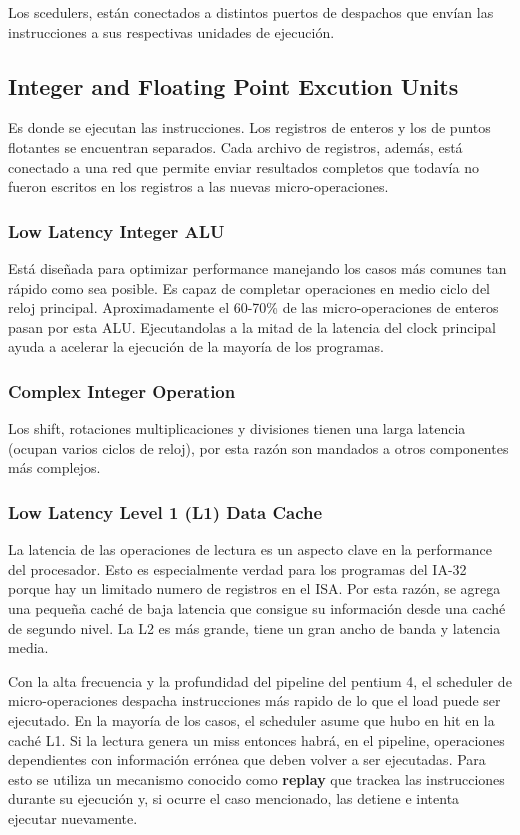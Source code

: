 Los scedulers, están conectados a distintos puertos de despachos que envían las instrucciones a sus respectivas unidades de ejecución.

\subsection{Integer and Floating Point Excution Units}
Es donde se ejecutan las instrucciones.
Los registros de enteros y los de puntos flotantes se encuentran separados. Cada archivo de registros, además, está conectado a una red que permite enviar resultados completos que todavía no fueron escritos en los registros a las nuevas micro-operaciones.

\subsubsection*{Low Latency Integer ALU}
Está diseñada para optimizar performance manejando los casos más comunes tan rápido como sea posible. Es capaz de completar operaciones en medio ciclo del reloj principal. Aproximadamente el 60-70\% de las micro-operaciones de enteros pasan por esta ALU. Ejecutandolas a la mitad de la latencia del clock principal ayuda a acelerar la ejecución de la mayoría de los programas.

\subsubsection*{Complex Integer Operation}
Los shift, rotaciones multiplicaciones y divisiones tienen una larga latencia (ocupan varios ciclos de reloj), por esta razón son mandados a otros componentes más complejos. 

\subsubsection*{Low Latency Level 1 (L1) Data Cache}
La latencia de las operaciones de lectura es un aspecto clave en la performance del procesador. Esto es especialmente verdad para los programas del IA-32 porque hay un limitado numero de registros en el ISA. Por esta razón, se agrega una pequeña caché de baja latencia que consigue su información desde una caché de segundo nivel. La L2 es más grande, tiene un gran ancho de banda y latencia media.

Con la alta frecuencia y la profundidad del pipeline del pentium 4, el scheduler de micro-operaciones despacha instrucciones más rapido de lo que el load puede ser ejecutado. En la mayoría de los casos, el scheduler asume que hubo en hit en la caché L1. Si la lectura genera un miss entonces habrá, en el pipeline, operaciones dependientes con información errónea que deben volver a ser ejecutadas. Para esto se utiliza un mecanismo conocido como \textbf{replay} que trackea las instrucciones durante su ejecución y, si ocurre el caso mencionado, las detiene e intenta ejecutar nuevamente. 

